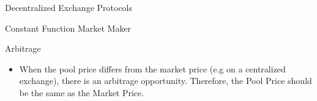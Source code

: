 \documentclass[]{beamer}
\begin{document}
\begin{frame}{Decentralized Exchange Protocols}

\end{frame}


\begin{frame}{Constant Function Market Maker}

	\begin{figure}	
		\centering
		
	\end{figure}


\end{frame}


\begin{frame}{Arbitrage}
	\begin{figure}
		\begin{tikzpicture}
		
		\end{tikzpicture}
	\end{figure}
	\begin{itemize}
		\item When the pool price differs from the market price (e.g on a centralized exchange), there is an arbitrage opportunity. Therefore, the Pool Price should be the same as the Market Price.
	\end{itemize}	
\end{frame}
\end{document}
